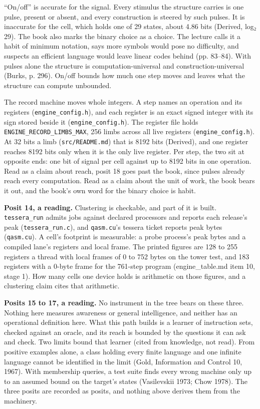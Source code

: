 “On/off” is accurate for the signal. Every stimulus the structure carries is one pulse, present or absent, and every construction is steered by such pulses. It is inaccurate for the cell, which holds one of 29 states, about 4.86 bits (Derived, log₂ 29). The book also marks the binary choice as a choice. The lecture calls it a habit of minimum notation, says more symbols would pose no difficulty, and suspects an efficient language would leave linear codes behind (pp. 83–84). With pulses alone the structure is computation-universal and construction-universal (Burks, p. 296). On/off bounds how much one step moves and leaves what the structure can compute unbounded.

The record machine moves whole integers. A step names an operation and its registers (\texttt{engine\_\allowbreak{}config.\allowbreak{}h}), and each register is an exact signed integer with its sign stored beside it (\texttt{engine\_\allowbreak{}config.\allowbreak{}h}). The register file holds \texttt{ENGINE\_\allowbreak{}RECORD\_\allowbreak{}LIMBS\_\allowbreak{}MAX}, 256 limbs across all live registers (\texttt{engine\_\allowbreak{}config.\allowbreak{}h}). At 32 bits a limb (\texttt{src/\allowbreak{}README.\allowbreak{}md}) that is 8192 bits (Derived), and one register reaches 8192 bits only when it is the only live register. Per step, the two sit at opposite ends: one bit of signal per cell against up to 8192 bits in one operation. Read as a claim about reach, posit 18 goes past the book, since pulses already reach every computation. Read as a claim about the unit of work, the book bears it out, and the book's own word for the binary choice is habit.

\textbf{Posit 14, a reading.} Clustering is checkable, and part of it is built. \texttt{tessera\_\allowbreak{}run} admits jobs against declared processors and reports each release's peak (\texttt{tessera\_\allowbreak{}run.\allowbreak{}c}), and \texttt{qasm.\allowbreak{}cu}'s tessera ticket reports peak bytes (\texttt{qasm.\allowbreak{}cu}). A cell's footprint is measurable: a probe process's peak bytes and a compiled lane's registers and local frame. The printed figures are 128 to 255 registers a thread with local frames of 0 to 752 bytes on the tower test, and 183 registers with a 0-byte frame for the 761-step program (engine\_\allowbreak{}table.md item 10, stage 1). How many cells one device holds is arithmetic on those figures, and a clustering claim cites that arithmetic.

\textbf{Posits 15 to 17, a reading.} No instrument in the tree bears on these three. Nothing here measures awareness or general intelligence, and neither has an operational definition here. What this path builds is a learner of instruction sets, checked against an oracle, and its reach is bounded by the questions it can ask and check. Two limits bound that learner (cited from knowledge, not read). From positive examples alone, a class holding every finite language and one infinite language cannot be identified in the limit (Gold, Information and Control 10, 1967). With membership queries, a test suite finds every wrong machine only up to an assumed bound on the target's states (Vasilevskii 1973; Chow 1978). The three posits are recorded as posits, and nothing above derives them from the machinery.

